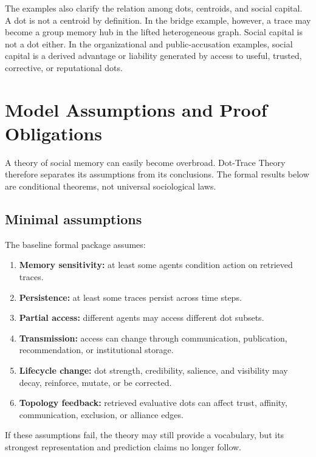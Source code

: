 \documentclass[11pt]{article}
\theoremstyle{remark}
\begin{document}
The examples also clarify the relation among dots, centroids, and social capital. A dot is not a centroid by definition. In the bridge example, however, a trace may become a group memory hub in the lifted heterogeneous graph. Social capital is not a dot either. In the organizational and public-accusation examples, social capital is a derived advantage or liability generated by access to useful, trusted, corrective, or reputational dots.

\section{Model Assumptions and Proof Obligations}\label{model-assumptions-proof-obligations}

A theory of social memory can easily become overbroad. Dot-Trace Theory
therefore separates its assumptions from its conclusions. The formal
results below are conditional theorems, not universal sociological laws.

\subsection{Minimal assumptions}\label{minimal-assumptions}

The baseline formal package assumes:

\begin{enumerate}[leftmargin=*]
\item \textbf{Memory sensitivity:} at least some agents condition action on retrieved traces.
\item \textbf{Persistence:} at least some traces persist across time steps.
\item \textbf{Partial access:} different agents may access different dot subsets.
\item \textbf{Transmission:} access can change through communication, publication, recommendation, or institutional storage.
\item \textbf{Lifecycle change:} dot strength, credibility, salience, and visibility may decay, reinforce, mutate, or be corrected.
\item \textbf{Topology feedback:} retrieved evaluative dots can affect trust, affinity, communication, exclusion, or alliance edges.
\end{enumerate}

If these assumptions fail, the theory may still provide a vocabulary,
but its strongest representation and prediction claims no longer follow.
\end{document}
